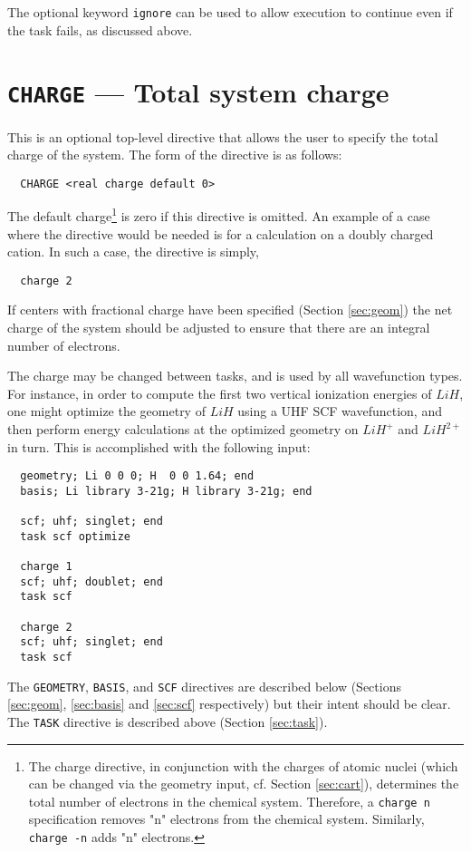 The optional keyword \verb+ignore+ can be used to allow execution to
continue even if the task fails, as discussed above.

\section{{\tt CHARGE} --- Total system charge}
\label{sec:charge}

This is an optional top-level directive that allows the user to specify
the total charge of the system.  The form of the directive is as follows:
\begin{verbatim}
  CHARGE <real charge default 0>
\end{verbatim}

The default charge\footnote{The charge directive, in conjunction with
  the charges of atomic nuclei (which can be changed via the geometry
  input, cf. Section \ref{sec:cart}), determines the total number of
  electrons in the chemical system.  Therefore, a {\tt charge n}
  specification removes "n" electrons from the chemical system.
  Similarly, {\tt charge -n} adds "n" electrons.} is zero
if this directive is omitted.  An example of a case where the
directive would be needed is for a calculation on a doubly charged
cation.  In such a case, the directive is simply,
\begin{verbatim}
  charge 2
\end{verbatim}

If centers with fractional charge have been specified (Section
\ref{sec:geom}) the net charge of the system should be adjusted to
ensure that there are an integral number of electrons.

The charge may be changed between tasks, and is used by all
wavefunction types.  For instance, in order to compute the first two
vertical ionization energies of $LiH$, one might optimize the geometry
of $LiH$ using a UHF SCF wavefunction, and then perform energy
calculations at the optimized geometry on $LiH^+$ and
$LiH^{2+}$ in turn.  This is accomplished with the following input:
\begin{verbatim}
  geometry; Li 0 0 0; H  0 0 1.64; end
  basis; Li library 3-21g; H library 3-21g; end

  scf; uhf; singlet; end
  task scf optimize

  charge 1
  scf; uhf; doublet; end
  task scf

  charge 2
  scf; uhf; singlet; end
  task scf
\end{verbatim}
The \verb+GEOMETRY+, \verb+BASIS+, and \verb+SCF+ directives are
described below (Sections \ref{sec:geom}, \ref{sec:basis} and
\ref{sec:scf} respectively) but their intent should be clear.  The
\verb+TASK+ directive is described above (Section \ref{sec:task}).  


